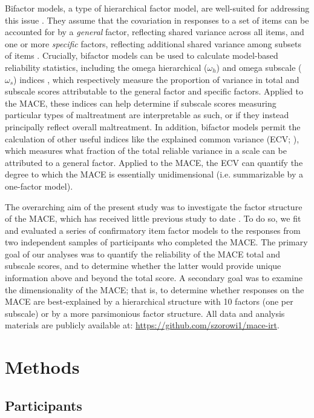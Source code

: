 \documentclass[letterpaper,man,natbib,noextraspace,floatsintext,longtable,12pt]{apa6}
\begin{document}
Bifactor models, a type of hierarchical factor model, are well-suited for addressing this issue \citep{bornovalova2020appropriate}. They assume that the covariation in responses to a set of items can be accounted for by a \emph{general} factor, reflecting shared variance across all items, and one or more \emph{specific} factors, reflecting additional shared variance among subsets of items \citep{Reise2012-ql}. Crucially, bifactor models can be used to calculate model-based reliability statistics, including the omega hierarchical ($\omega_h$) and omega subscale ($\omega_s$) indices \citep{reise2013scoring}, which respectively measure the proportion of variance in total and subscale scores attributable to the general factor and specific factors. Applied to the MACE, these indices can help determine if subscale scores measuring particular types of maltreatment are interpretable as such, or if they instead principally reflect overall maltreatment. In addition, bifactor models permit the calculation of other useful indices like the explained common variance (ECV; \citealt{sijtsma2009use}), which measures what fraction of the total reliable variance in a scale can be attributed to a general factor. Applied to the MACE, the ECV can quantify the degree to which the MACE is essentially unidimensional (i.e. summarizable by a one-factor model). 

The overarching aim of the present study was to investigate the factor structure of the MACE, which has received little previous study to date \citep{saini2019systematic}. To do so, we fit and evaluated a series of confirmatory item factor models to the responses from two independent samples of participants who completed the MACE. The primary goal of our analyses was to quantify the reliability of the MACE total and subscale scores, and to determine whether the latter would provide unique information above and beyond the total score. A secondary goal was to examine the dimensionality of the MACE; that is, to determine whether responses on the MACE are best-explained by a hierarchical structure with 10 factors (one per subscale) or by a more parsimonious factor structure. All data and analysis materials are publicly available at: \url{https://github.com/szorowi1/mace-irt}.

\section{Methods}

\subsection{Participants}
\end{document}
